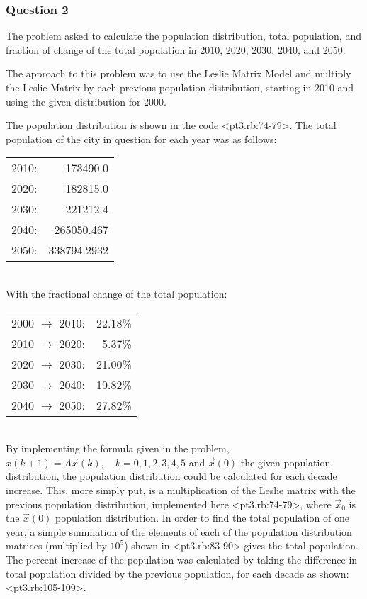 \documentclass[letterpaper,11pt]{article}
\begin{document}
\subsubsection{Question 2}

The problem asked to calculate the population distribution, total population,
and fraction of change of the total population in 2010, 2020, 2030, 2040, and 2050. 

The approach to this problem was to use the Leslie Matrix Model and multiply the
Leslie Matrix by each previous population distribution, starting in 2010 and
using the given distribution for 2000.

The population distribution is shown in the code <pt3.rb:74-79>.
The total population of the city in question for each year was as follows:

\begin{tabular}{l r}
2010: & 173490.0 \\
2020: & 182815.0 \\
2030: & 221212.4 \\
2040: & 265050.467 \\
2050: & 338794.2932
\end{tabular}
\\

With the fractional change of the total population:


\begin{tabular}{l r}
2000 $\to$ 2010: & 22.18\% \\
2010 $\to$ 2020: & 5.37\% \\
2020 $\to$ 2030: & 21.00\% \\
2030 $\to$ 2040: & 19.82\% \\
2040 $\to$ 2050: & 27.82\%
\end{tabular}
\\

By implementing the formula given in the problem,
$x(k + 1) = A\vec{x}(k), \quad k = 0,1,2,3,4,5$ and $\vec{x}(0)$ the given
population distribution, the population distribution could be calculated for
each decade increase.
This, more simply put, is a multiplication of the Leslie matrix with the
previous population distribution, implemented here <pt3.rb:74-79>,
where $\vec{x}_0$ is the $\vec{x}(0)$ population distribution.
In order to find the total population of one year, a simple summation of the
elements of each of the population distribution matrices (multiplied by $10^5$)
shown in <pt3.rb:83-90> gives the total population.
The percent increase of the population was calculated by taking the difference
in total population divided by the previous population,
for each decade as shown: <pt3.rb:105-109>. 
\end{document}

